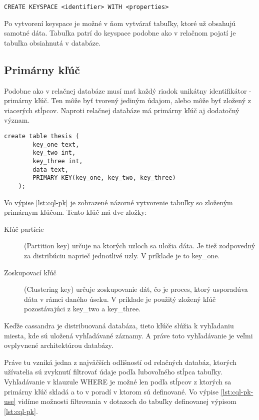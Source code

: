 	\begin{lstlisting}[label=lst:create-keyspace,caption=Syntax pre vytvorenie nového keyspace]
	CREATE KEYSPACE <identifier> WITH <properties>
	\end{lstlisting}
	
	Po vytvorení keyspace je možné v ňom vytvárať tabuľky, ktoré už obsahujú samotné dáta. Tabuľka patrí do keyspace podobne ako v relačnom pojatí je tabuľka obsiahnutá v databáze.

	\subsection{Primárny kľúč}
	Podobne ako v relačnej databáze musí mať každý riadok unikátny identifikátor - primárny kľúč. Ten môže byť tvorený jediným údajom, alebo môže byť zložený z viacerých stĺpcov. Naproti relačnej databáze má primárny kľúč aj dodatočný význam.
	
	\begin{lstlisting}[label=lst:cql-pk,caption=Tvorenie primárneho kľúča v CQL]
	create table thesis (
		key_one text,
		key_two int,
		key_three int,
		data text,
		PRIMARY KEY(key_one, key_two, key_three)
	);
	\end{lstlisting}
	
	Vo výpise \ref{lst:cql-pk} je zobrazené názorné vytvorenie tabuľky so zloženým primárnym kľúčom. Tento kľúč má dve zložky:
	\begin{description}
		\item[Kľúč partície] (Partition key) určuje na ktorých uzloch sa uložia dáta. Je tiež zodpovedný za distribúciu naprieč jednotlivé uzly. V príklade je to key\_one.
		\item[Zoskupovací kľúč] (Clustering key) určuje zoskupovanie dát, čo je proces, ktorý usporadúva dáta v rámci daného úseku. V príklade je použitý zložený kľúč pozostávajúci z key\_two a key\_three.
	\end{description}
	Keďže cassandra je distribuovaná databáza, tieto kľúče slúžia k vyhľadaniu miesta, kde sú uložená vyhľadávané záznamy. A práve toto vyhľadávanie je veľmi ovplyvnené architektúrou databázy.
	
	Práve tu vzniká jedna z najväčších odlišností od relačných databáz, ktorých užívatelia sú zvyknutí filtrovať údaje podľa ľubovoľného stĺpca tabuľky. Vyhľadávanie v klauzule WHERE je možné len podľa stĺpcov z ktorých sa primárny kľúč skladá a to v poradí v ktorom sú definované. Vo výpise \ref{lst:cql-pk-use} vidíme možnosti filtrovania v dotazoch do tabuľky definovanej výpisom \ref{lst:cql-pk}.
	
